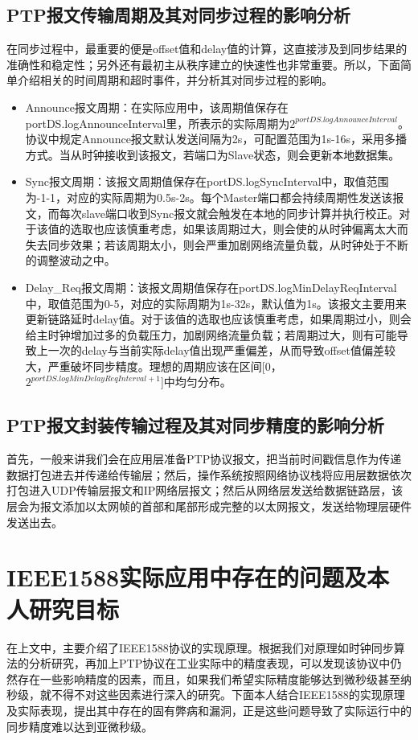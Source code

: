 \subsection{PTP报文传输周期及其对同步过程的影响分析}
在同步过程中，最重要的便是offset值和delay值的计算，这直接涉及到同步结果的准确性和稳定性；另外还有最初主从秩序建立的快速性也非常重要。所以，下面简单介绍相关的时间周期和超时事件，并分析其对同步过程的影响。
\begin{itemize}[noitemsep,topsep=0pt,parsep=0pt,partopsep=0pt]
	\item Announce报文周期：在实际应用中，该周期值保存在portDS.logAnnounceInterval里，所表示的实际周期为$2^{portDS.logAnnounceInterval}$。协议中规定Announce报文默认发送间隔为2s，可配置范围为1s-16s，采用多播方式。当从时钟接收到该报文，若端口为Slave状态，则会更新本地数据集。
	\item Sync报文周期：该报文周期值保存在portDS.logSyncInterval中，取值范围为-1-1，对应的实际周期为0.5s-2s。每个Master端口都会持续周期性发送该报文，而每次slave端口收到Sync报文就会触发在本地的同步计算并执行校正。对于该值的选取也应该慎重考虑，如果该周期过大，则会使的从时钟偏离太大而失去同步效果；若该周期太小，则会严重加剧网络流量负载，从时钟处于不断的调整波动之中。
	\item Delay\_Req报文周期：该报文周期值保存在portDS.logMinDelayReqInterval中，取值范围为0-5，对应的实际周期为1s-32s，默认值为1s。该报文主要用来更新链路延时delay值。对于该值的选取也应该慎重考虑，如果周期过小，则会给主时钟增加过多的负载压力，加剧网络流量负载；若周期过大，则有可能导致上一次的delay与当前实际delay值出现严重偏差，从而导致offset值偏差较大，严重破坏同步精度。理想的周期应该在区间[0， $2^{portDS.logMinDelayReqInterval+1}$]中均匀分布。
\end{itemize}

\subsection{PTP报文封装传输过程及其对同步精度的影响分析}
首先，一般来讲我们会在应用层准备PTP协议报文，把当前时间戳信息作为传递数据打包进去并传递给传输层；然后，操作系统按照网络协议栈将应用层数据依次打包进入UDP传输层报文和IP网络层报文；然后从网络层发送给数据链路层，该层会为报文添加以太网帧的首部和尾部形成完整的以太网报文，发送给物理层硬件发送出去\supercite{54}。

\section{IEEE1588实际应用中存在的问题及本人研究目标}
在上文中，主要介绍了IEEE1588协议的实现原理。根据我们对原理如时钟同步算法的分析研究，再加上PTP协议在工业实际中的精度表现，可以发现该协议中仍然存在一些影响精度的因素，而且，如果我们希望实际精度能够达到微秒级甚至纳秒级，就不得不对这些因素进行深入的研究。下面本人结合IEEE1588的实现原理及实际表现，提出其中存在的固有弊病和漏洞，正是这些问题导致了实际运行中的同步精度难以达到亚微秒级。


